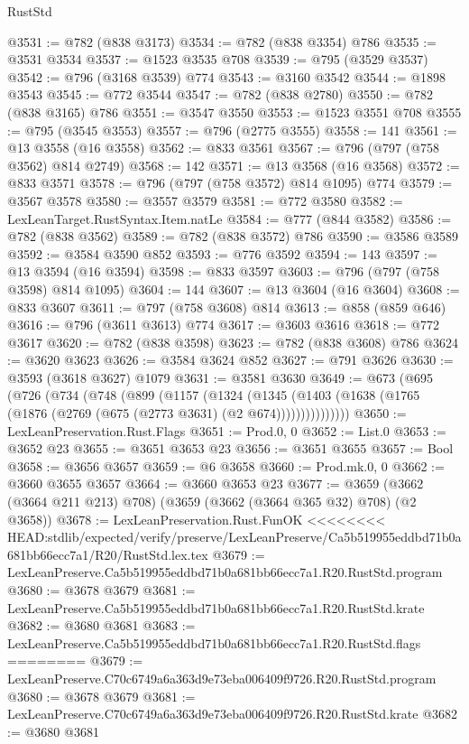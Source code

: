 \begin{lexlean}{RustStd}
\begin{coremodule}
{\begin{coremodule}
{{{{{{{{{{{{{{@3531 := @782 (@838 @3173)
@3534 := @782 (@838 @3354) @786
@3535 := @3531 @3534
@3537 := @1523 @3535 @708
@3539 := @795 (@3529 @3537)
@3542 := @796 (@3168 @3539) @774
@3543 := @3160 @3542
@3544 := @1898 @3543
@3545 := @772 @3544
@3547 := @782 (@838 @2780)
@3550 := @782 (@838 @3165) @786
@3551 := @3547 @3550
@3553 := @1523 @3551 @708
@3555 := @795 (@3545 @3553)
@3557 := @796 (@2775 @3555)
@3558 := 141
@3561 := @13 @3558 (@16 @3558)
@3562 := @833 @3561
@3567 := @796 (@797 (@758 @3562) @814 @2749)
@3568 := 142
@3571 := @13 @3568 (@16 @3568)
@3572 := @833 @3571
@3578 := @796 (@797 (@758 @3572) @814 @1095) @774
@3579 := @3567 @3578
@3580 := @3557 @3579
@3581 := @772 @3580
@3582 := LexLeanTarget.RustSyntax.Item.natLe
@3584 := @777 (@844 @3582)
@3586 := @782 (@838 @3562)
@3589 := @782 (@838 @3572) @786
@3590 := @3586 @3589
@3592 := @3584 @3590 @852
@3593 := @776 @3592
@3594 := 143
@3597 := @13 @3594 (@16 @3594)
@3598 := @833 @3597
@3603 := @796 (@797 (@758 @3598) @814 @1095)
@3604 := 144
@3607 := @13 @3604 (@16 @3604)
@3608 := @833 @3607
@3611 := @797 (@758 @3608) @814
@3613 := @858 (@859 @646)
@3616 := @796 (@3611 @3613) @774
@3617 := @3603 @3616
@3618 := @772 @3617
@3620 := @782 (@838 @3598)
@3623 := @782 (@838 @3608) @786
@3624 := @3620 @3623
@3626 := @3584 @3624 @852
@3627 := @791 @3626
@3630 := @3593 (@3618 @3627) @1079
@3631 := @3581 @3630
@3649 := @673
    (@695
      (@726
        (@734
          (@748
            (@899
              (@1157
                (@1324
                  (@1345
                    (@1403 (@1638 (@1765 (@1876 (@2769 (@675 (@2773 @3631) (@2 @674)))))))))))))))
@3650 := LexLeanPreservation.Rust.Flags
@3651 := Prod.{0, 0}
@3652 := List.{0}
@3653 := @3652 @23
@3655 := @3651 @3653 @23
@3656 := @3651 @3655
@3657 := Bool
@3658 := @3656 @3657
@3659 := @6 @3658
@3660 := Prod.mk.{0, 0}
@3662 := @3660 @3655 @3657
@3664 := @3660 @3653 @23
@3677 := @3659 (@3662 (@3664 @211 @213) @708) (@3659 (@3662 (@3664 @365 @32) @708) (@2 @3658))
@3678 := LexLeanPreservation.Rust.FunOK
<<<<<<<< HEAD:stdlib/expected/verify/preserve/LexLeanPreserve/Ca5b519955eddbd71b0a681bb66ecc7a1/R20/RustStd.lex.tex
@3679 := LexLeanPreserve.Ca5b519955eddbd71b0a681bb66ecc7a1.R20.RustStd.program
@3680 := @3678 @3679
@3681 := LexLeanPreserve.Ca5b519955eddbd71b0a681bb66ecc7a1.R20.RustStd.krate
@3682 := @3680 @3681
@3683 := LexLeanPreserve.Ca5b519955eddbd71b0a681bb66ecc7a1.R20.RustStd.flags
========
@3679 := LexLeanPreserve.C70c6749a6a363d9e73eba006409f9726.R20.RustStd.program
@3680 := @3678 @3679
@3681 := LexLeanPreserve.C70c6749a6a363d9e73eba006409f9726.R20.RustStd.krate
@3682 := @3680 @3681
}}}}}}}}}}}}}}
\end{coremodule}}
\end{coremodule}
\end{lexlean}
